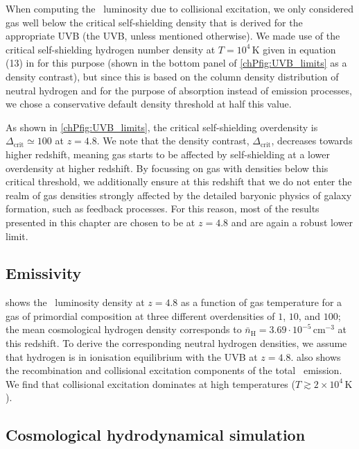 When computing the \lya\ luminosity due to collisional excitation, we only considered gas well below the critical self-shielding density that is derived for the appropriate UVB (the  UVB, unless mentioned otherwise). We made use of the critical self-shielding hydrogen number density at $T = 10^4 \, \mathrm{K}$ given in equation (13) in \citet{2013MNRAS.430.2427R} for this purpose (shown in the bottom panel of \cref{chPfig:UVB_limits} as a density contrast), but since this is based on the column density distribution of neutral hydrogen and for the purpose of absorption instead of emission processes, we chose a conservative default density threshold at half this value.

As shown in \cref{chPfig:UVB_limits}, the critical self-shielding overdensity is $\Delta_\text{crit} \simeq 100$ at $z=4.8$. We note that the density contrast, $\Delta_\text{crit}$, decreases towards higher redshift, meaning gas starts to be affected by self-shielding at a lower overdensity at higher redshift. By focussing on gas with densities below this critical threshold, we additionally ensure at this redshift that we do not enter the realm of gas densities strongly affected by the detailed baryonic physics of galaxy formation, such as feedback processes. For this reason, most of the results presented in this chapter are chosen to be at $z=4.8$ and are again a robust lower limit.

\subsection{Emissivity}
\label{chPssec:Emissivity}

 shows the \lya\ luminosity density at $z=4.8$ as a function of gas temperature for a gas of primordial composition at three different overdensities of $1$, $10$, and $100$; the mean cosmological hydrogen density corresponds to $\bar{n}_\text{H} = 3.69 \cdot 10^{-5} \, \mathrm{cm^{-3}}$ at this redshift. To derive the corresponding neutral hydrogen densities, we assume that hydrogen is in ionisation equilibrium with the  UVB at $z=4.8$.  also shows the recombination and collisional excitation components of the total \lya\ emission. We find that collisional excitation dominates at high temperatures ($T \gtrsim 2 \times 10^4 \, \mathrm{K}$).

\subsection{Cosmological hydrodynamical simulation}
\label{chPssec:SherwoodSuite}

